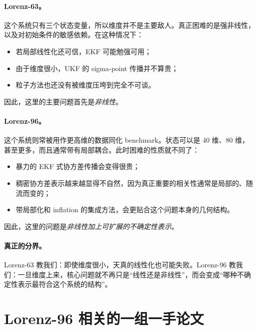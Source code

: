 \documentclass[12pt,a4paper]{ctexart}
\begin{document}
\paragraph{Lorenz-63。}
这个系统只有三个状态变量，所以维度并不是主要敌人。真正困难的是强非线性，以及对初始条件的敏感依赖。在这种情况下：
\begin{itemize}
  \item 若局部线性化还可信，EKF 可能勉强可用；
  \item 由于维度很小，UKF 的 sigma-point 传播并不算贵；
  \item 粒子方法也还没有被维度压垮到完全不可谈。
\end{itemize}
因此，这里的主要问题首先是\emph{非线性}。

\paragraph{Lorenz-96。}
这个系统则常被用作更高维的数据同化 benchmark。状态可以是 40 维、80 维，甚至更多，而且通常带有局部耦合。此时困难的性质就不同了：
\begin{itemize}
  \item 暴力的 EKF 式协方差传播会变得很贵；
  \item 稠密协方差表示越来越显得不自然，因为真正重要的相关性通常是局部的、随流而变的；
  \item 带局部化和 inflation 的集成方法，会更贴合这个问题本身的几何结构。
\end{itemize}
因此，这里的问题是\emph{非线性加上可扩展的不确定性表示}。

\paragraph{真正的分界。}
Lorenz-63 教我们：即使维度很小，天真的线性化也可能失败。Lorenz-96 教我们：一旦维度上来，核心问题就不再只是“线性还是非线性”，而会变成“哪种不确定性表示最符合这个系统的结构”。

\section{Lorenz-96 相关的一组一手论文}\label{app:lorenz-lit}
\end{document}
